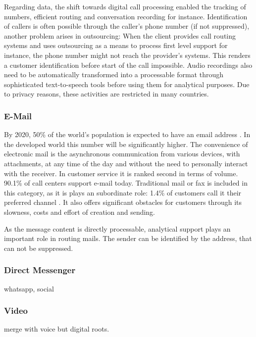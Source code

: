 		Regarding data, the shift towards digital call processing enabled the tracking of numbers, efficient routing and conversation recording for instance. Identification of callers is often possible through the caller's phone number (if not suppressed), another problem arises in outsourcing: When the client provides call routing systems and uses outsourcing as a means to process first level support for instance, the phone number might not reach the provider's systems. This renders a customer identification before start of the call impossible. Audio recordings also need to be automatically transformed into a processable format through sophisticated text-to-speech tools before using them for analytical purposes. Due to privacy reasons, these activities are restricted in many countries. 
		
		\subsubsection{E-Mail}
		
		By 2020, 50\% of the world's population is expected to have an email address \cite{radial2016}. In the developed world this number will be significantly higher. The convenience of electronic mail is the asynchronous communication from various devices, with attachments, at any time of the day and without the need to personally interact with the receiver. In customer service it is ranked second in terms of volume. 90.1\% of call centers support e-mail \cite{dimensiondata2016} today. Traditional mail or fax is included in this category, as it is plays an subordinate role: 1.4\% of customers call it their preferred channel \cite{ocm2015}. It also offers significant obstacles for customers through its slowness, costs and effort of creation and sending. 
		
		As the message content is directly processable, analytical support plays an important role in routing mails. The sender can be identified by the address, that can not be suppressed. 
		
		\subsubsection{Direct Messenger}
		
		whatsapp, social 
		\subsubsection{Video}
		
		merge with voice but digital roots. 
		
